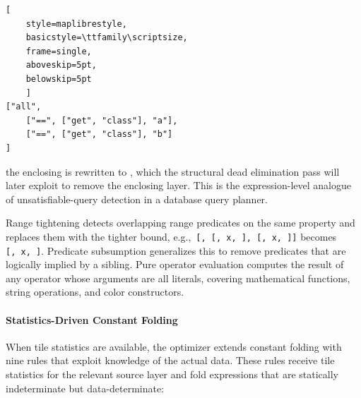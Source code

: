\begin{lstlisting}[
	style=maplibrestyle,
	basicstyle=\ttfamily\scriptsize,
	frame=single,
	aboveskip=5pt,
	belowskip=5pt
	]
["all",
	["==", ["get", "class"], "a"],
	["==", ["get", "class"], "b"]
]
\end{lstlisting}

\noindent the enclosing  is rewritten to , which the structural dead elimination pass will later exploit to remove the enclosing layer.
This is the expression-level analogue of unsatisfiable-query detection in a database query planner.

Range tightening detects overlapping range predicates on the same property and replaces them with the tighter bound, e.g.,\ \texttt{[,~[,~x,~],~[,~x,~]]} becomes \texttt{[,~x,~]}.
Predicate subsumption generalizes this to remove predicates that are logically implied by a sibling.
Pure operator evaluation computes the result of any operator whose arguments are all literals, covering mathematical functions, string operations, and color constructors.

\paragraph{Statistics-Driven Constant Folding}
When tile statistics are available, the optimizer extends constant folding with nine rules that exploit knowledge of the actual data.
These rules receive tile statistics for the relevant source layer and fold expressions that are statically indeterminate but data-determinate:

